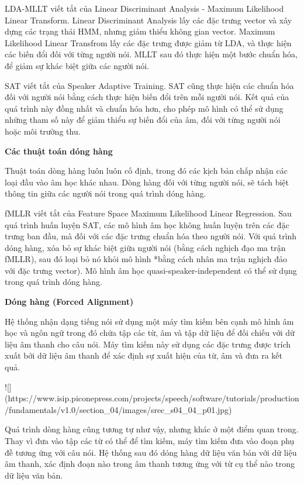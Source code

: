 LDA-MLLT viết tắt của Linear Discriminant Analysis - Maximum Likelihood Linear Transform. Linear Discriminant Analysis lấy các đặc trưng vector và xây dựng các trạng thái HMM, nhưng giảm thiểu không gian vector. Maximum Likelihood Linear Transfrom lấy các đặc trưng được giảm từ LDA, và thực hiện các biến đổi đối với từng người nói. MLLT sau đó thực hiện một bước chuẩn hóa, để giảm sự khác biệt giữa các người nói.

SAT viết tắt của Speaker Adaptive Training. SAT cũng thực hiện các chuẩn hóa đối với người nói bằng cách thực hiện biến đổi trên mỗi người nói. Kết quả của quá trình này đồng nhất và chuẩn hóa hơn, cho phép mô hình có thể sử dụng những tham số này để giảm thiểu sự biến đổi của âm, đối với từng người nói hoặc môi trường thu.

\textbf{Các thuật toán dóng hàng}

Thuật toán dòng hàng luôn luôn cố định, trong đó các kịch bản chấp nhận các loại đầu vào âm học khác nhau. Dòng hàng đối với từng người nói, sẽ tách biệt thông tin giữa các người nói trong quá trình dóng hàng.

fMLLR viết tắt của Feature Space Maximum Likelihood Linear Regression. Sau quá trình huấn luyện SAT, các mô hình âm học không huấn luyện trên các đặc trưng ban đầu, mà đối với các đặc trưng chuẩn hóa theo người nói. Với quá trình dóng hàng, xóa bỏ sự khác biệt giữa người nói (bằng cách nghịch đạo ma trận fMLLR), sau đó loại bỏ nó khỏi mô hình *bằng cách nhân ma trận nghịch đảo với đặc trưng vector). Mô hình âm học quasi-speaker-independent có thể sử dụng trong quá trình dóng hàng.

\textbf{Dóng hàng (Forced Alignment)}

Hệ thống nhận dạng tiếng nói sử dụng một máy tìm kiếm bên cạnh mô hình âm học và ngôn ngữ trong đó chứa tập các từ, âm và tập dữ liệu để đối chiếu với dữ liệu âm thanh cho câu nói. Máy tìm kiếm này sử dụng các đặc trưng được trích xuất bởi dữ liệu âm thanh để xác định sự xuất hiện của từ, âm và đưa ra kết quả.

![](https://www.isip.piconepress.com/projects/speech/software/tutorials/production/fundamentals/v1.0/section_04/images/srec_s04_04_p01.jpg)

Quá trình dòng hàng cũng tương tự như vậy, nhưng khác ở một điểm quan trong. Thay vì đưa vào tập các từ có thể để tìm kiếm, máy tìm kiếm đưa vào đoạn phụ đề tương ứng với câu nói. Hệ thống sau đó dóng hàng dữ liệu văn bản với dữ liệu âm thanh, xác định đoạn nào trong âm thanh tương ứng với từ cụ thể nào trong dữ liệu văn bản.

